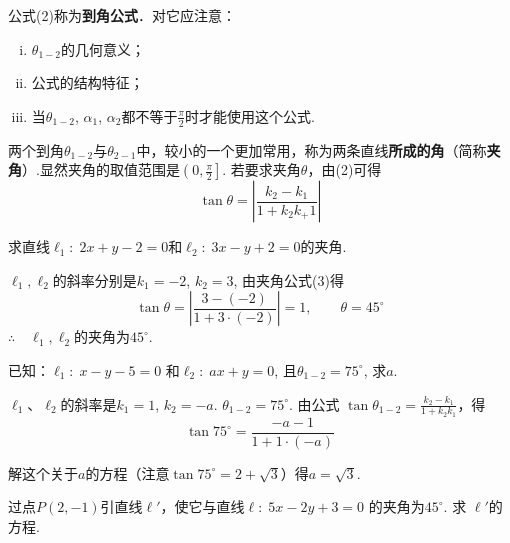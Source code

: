 公式(2)称为\textbf{到角公式}．对它应注意：
\begin{enumerate}[(i)]
    \item $\theta_{1-2}$的几何意义；
    \item 公式的结构特征；
    \item 当$\theta_{1-2}$, $\alpha_1$, $\alpha_2$都不等于$\frac{\pi}{2}$时才能使用这个公式.
\end{enumerate}

两个到角$\theta_{1-2}$与$\theta_{2-1}$中，较小的一个更加常用，称为两条直线\textbf{所成的角}（简称\textbf{夹角}）.显然夹角的取值范围是$\left(0,\frac{\pi}{2}\right]$. 若要求夹角$\theta$，由(2)可得
\begin{equation}
    \tan\theta =\left|\frac{k_2-k_1}{1+k_2k_+1}\right|
\end{equation}

\begin{example}
    求直线$\ell_1:\; 2x+y-2=0$和$\ell_2:\; 3x-y+2=0$的夹角.
\end{example}


\begin{solution}
    $\ell_1,\ell_2$的斜率分别是$k_1=-2$, $k_2=3$, 由夹角公式(3)得
\[\tan\theta=\left|\frac{3-(-2)}{1+3\cdot(-2)}\right|=1,\qquad \theta=45^{\circ}\]
$\therefore \quad \ell_1,\ell_2$的夹角为$45^{\circ}$.
\end{solution}


\begin{example}
    已知：$\ell_1:\; x-y-5=0$ 和$\ell_2:\; ax+y=0$, 且$\theta_{1-2}=75^{\circ}$, 求$a$.
\end{example}

\begin{solution}
    $\ell_1$、$\ell_2$的斜率是$k_1=1$, $k_2=-a$. $\theta_{1-2}=75^\circ$. 由公式
$\tan\theta_{1-2}=\frac{k_2-k_1}{1+k_2k_1}$，得
    $$\tan 75^{\circ}=\frac{-a-1}{1+1\cdot(-a)}$$

解这个关于$a$的方程（注意$\tan75^{\circ}=2+\sqrt{3}$）得$a=\sqrt{3}$.
\end{solution}


\begin{example}
 过点$P(2,-1)$引直线$\ell'$，使它与直线$\ell:\; 5x-2y+3=0$ 的夹角为$45^{\circ}$. 求 $\ell'$的方程.
\end{example}

